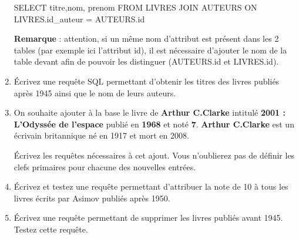 \documentclass[
  letterpaper,
  DIV=11,
  numbers=noendperiod]{scrartcl}
\newenvironment{Shaded}{\begin{snugshade}}{\end{snugshade}}
\newcommand{\KeywordTok}[1]{\textcolor[rgb]{0.00,0.23,0.31}{#1}}
\newcommand{\NormalTok}[1]{\textcolor[rgb]{0.00,0.23,0.31}{#1}}
\newcommand{\OperatorTok}[1]{\textcolor[rgb]{0.37,0.37,0.37}{#1}}
\begin{document}
\begin{enumerate}
\begin{Shaded}
\begin{Highlighting}[]
\KeywordTok{SELECT}\NormalTok{ titre,nom, prenom}
\KeywordTok{FROM}\NormalTok{ LIVRES }\KeywordTok{JOIN}\NormalTok{ AUTEURS }
\KeywordTok{ON}\NormalTok{ LIVRES.id\_auteur }\OperatorTok{=}\NormalTok{ AUTEURS.}\KeywordTok{id}
\end{Highlighting}
\end{Shaded}

  \textbf{Remarque} : attention, si un même nom d'attribut est présent
  dans les 2 tables (par exemple ici l'attribut id), il est nécessaire
  d'ajouter le nom de la table devant afin de pouvoir les distinguer
  (AUTEURS.id et LIVRES.id).
\item
  Écrivez une requête SQL permettant d'obtenir les titres des livres
  publiés après 1945 ainsi que le nom de leurs auteurs.
\item
  On souhaite ajouter à la base le livre de \textbf{Arthur C.Clarke}
  intitulé \textbf{2001 : L'Odyssée de l'espace} publié en \textbf{1968}
  et noté \textbf{7}. \textbf{Arthur C.Clarke} est un écrivain
  britannique né en 1917 et mort en 2008.

  Écrivez les requêtes nécessaires à cet ajout. Vous n'oublierez pas de
  définir les clefs primaires pour chacune des nouvelles entrées.
\item
  Écrivez et testez une requête permettant d'attribuer la note de 10 à
  tous les livres écrits par Asimov publiés après 1950.
\item
  Écrivez une requête permettant de supprimer les livres publiés avant
  1945. Testez cette requête.
\end{enumerate}
\end{document}
